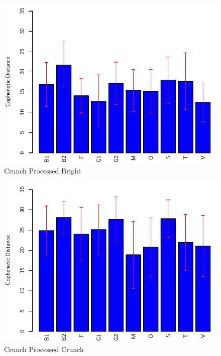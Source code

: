 		\begin{figure}[h!]
			\centering
			\includegraphics{chapter7/Images/CrunchProcessedBrightBar.pdf}
			\caption{Crunch Processed Bright}
		\end{figure}

		\begin{figure}[h!]
			\centering
			\includegraphics{chapter7/Images/CrunchProcessedCrunchBar.pdf}
			\caption{Crunch Processed Crunch}
		\end{figure}

